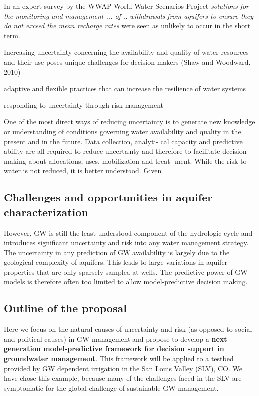 \documentclass[11pt,final]{article}%
\begin{document}
In an expert survey by the WWAP World Water Scenarios Project  \emph{solutions for the monitoring and management ... of .. withdrawals from aquifers to ensure they do not exceed the mean recharge rates} were seen as unlikely to occur in the short term.

Increasing uncertainty concerning the availability and quality of water resources and their use poses unique challenges for decision-makers (Shaw and Woodward, 2010)

adaptive and flexible practices that can increase the resilience of water systems

responding to uncertainty through risk management

One of the most direct ways of reducing uncertainty is to generate new knowledge or understanding of conditions governing water availability and quality in the present and in the future. Data collection, analyti- cal capacity and predictive ability are all required to reduce uncertainty and therefore to facilitate decision- making about allocations, uses, mobilization and treat- ment. While the risk to water is not reduced, it is better understood.
Given

\subsection{Challenges and opportunities in aquifer characterization}

However, GW is still the least understood component of the hydrologic cycle \cite{Re2015} and introduces significant uncertainty and risk into any water management strategy. The uncertainty in any prediction of GW availability is largely due to the geological complexity of aquifers.  This leads to large variations in aquifer properties that are only sparsely sampled at wells. The predictive power of GW models is therefore often too limited to allow model-predictive decision making.

\subsection{Outline of the proposal}
Here we focus on the natural causes of uncertainty and risk (as opposed to social and political causes) in GW management and propose to develop a \textbf{next generation model-predictive framework for decision support in groundwater management}. This framework will be applied to a testbed provided by GW dependent irrigation in the San Louis Valley (SLV), CO. We have chose this example, because many of the challenges faced in the SLV are symptomatic for the global challenge of sustainable GW management.
\end{document}
